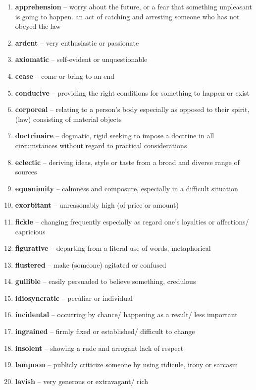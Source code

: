 \begin{enumerate}[wide,labelindent=0pt]
\item \textbf{apprehension} --  worry about the future, or a fear that something unpleasant is going to happen.  an act of catching and arresting someone who has not obeyed the law
\item \textbf{ardent} -- very enthusiastic or passionate
\item \textbf{axiomatic} -- self-evident or unquestionable
\item \textbf{cease} -- come or bring to an end
\item \textbf{conducive} -- providing the right conditions for something to happen or exist
\item \textbf{corporeal} -- relating to a person's body especially as opposed to their spirit, (law) consisting of material objects
\item \textbf{doctrinaire} -- dogmatic, rigid seeking to impose a doctrine in all circumstances without regard to practical considerations
\item \textbf{eclectic} -- deriving ideas, style or taste from a broad and diverse range of sources
\item \textbf{equanimity} -- calmness and composure, especially in a difficult situation
\item \textbf{exorbitant} -- unreasonably high (of price or amount)
\item \textbf{fickle} -- changing frequently especially as regard one's loyalties or affections/ capricious
\item \textbf{figurative} -- departing from a literal use of words, metaphorical
\item \textbf{flustered} -- make (someone) agitated or confused
\item \textbf{gullible} -- easily persuaded to believe something, credulous
\item \textbf{idiosyncratic} -- peculiar or individual
\item \textbf{incidental} -- occurring by chance/ happening as a result/ less important
\item \textbf{ingrained} -- firmly fixed or established/ difficult to change
\item \textbf{insolent} -- showing a rude and arrogant lack of respect
\item \textbf{lampoon} -- publicly criticize someone by using ridicule, irony or sarcasm
\item \textbf{lavish} -- very generous or extravagant/ rich

\end{enumerate}
